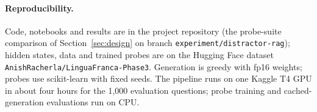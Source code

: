 \documentclass[11pt]{article}
\begin{document}
\paragraph{Reproducibility.} Code, notebooks and results are in the project repository (the probe-suite comparison of Section~\ref{sec:design} on branch \texttt{experiment/distractor-rag}); hidden states, data and trained probes are on the Hugging Face dataset \texttt{AnishRacherla/LinguaFranca-Phase3}. Generation is greedy with fp16 weights; probes use scikit-learn \citep{pedregosa2011scikit} with fixed seeds. The pipeline runs on one Kaggle T4 GPU in about four hours for the 1,000 evaluation questions; probe training and cached-generation evaluations run on CPU.
\end{document}
